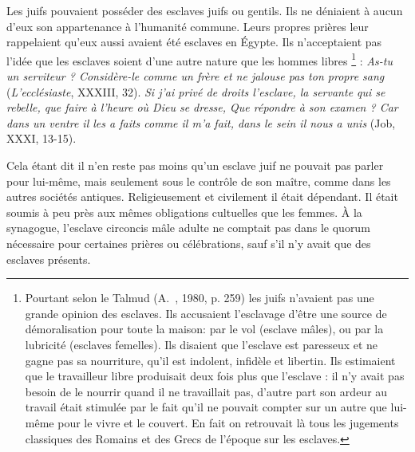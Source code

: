  Les juifs pouvaient posséder des esclaves juifs ou gentils. Ils ne déniaient à aucun d'eux son appartenance à l'humanité commune. Leurs propres prières leur rappelaient qu'eux aussi avaient été esclaves en Égypte. Ils n'acceptaient pas l'idée que les esclaves soient d'une autre nature que les hommes libres%
\footnote{Pourtant selon le Talmud (A.~, 1980, p. 259) les juifs n'avaient pas une grande opinion des esclaves. Ils accusaient l'esclavage d'être une source de démoralisation pour toute la maison: par le vol (esclave mâles), ou par la lubricité (esclaves femelles). Ils disaient que l'esclave est paresseux et ne gagne pas sa nourriture, qu'il est indolent, infidèle et libertin. Ils estimaient que le travailleur libre produisait deux fois plus que l'esclave : il n'y avait pas besoin de le nourrir quand il ne travaillait pas, d'autre part son ardeur au travail était stimulée par le fait qu'il ne pouvait compter sur un autre que lui-même pour le vivre et le couvert. En fait on retrouvait là tous les jugements classiques des Romains et des Grecs de l'époque sur les esclaves.}%
 : {\emph{As-tu un serviteur ? Considère-le comme un frère et ne jalouse pas ton propre sang}} (\emph{L'ecclésiaste}, XXXIII, 32). {\emph{Si j'ai privé de droits l'esclave, la servante qui se rebelle, que faire à l'heure où Dieu se dresse, Que répondre à son examen ? Car dans un ventre il les a faits comme il m'a fait, dans le sein il nous a unis}} (Job, XXXI, 13-15). 

 Cela étant dit il n'en reste pas moins qu'un esclave juif ne pouvait pas parler pour lui-même, mais seulement sous le contrôle de son maître, comme dans les autres sociétés antiques. Religieusement et civilement il était dépendant. Il était soumis à peu près aux mêmes obligations cultuelles que les femmes. À la synagogue, l'esclave circoncis mâle adulte ne comptait pas dans le quorum nécessaire pour certaines prières ou célébrations, sauf s'il n'y avait que des esclaves présents.

